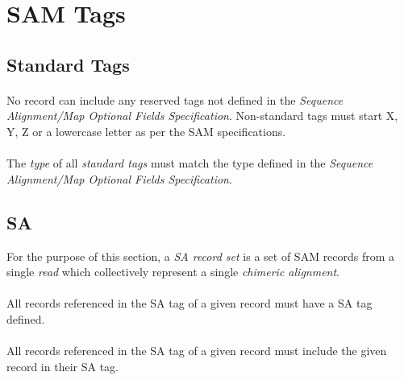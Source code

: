\documentclass[10pt]{article}
\begin{document}
\section{SAM Tags}

\subsection{Standard Tags}

\paragraph{}

No record can include any reserved tags not defined in the
{\sl Sequence Alignment/Map Optional Fields Specification}.
Non-standard tags must start X, Y, Z or a lowercase letter as per the SAM specifications.

\paragraph{}

The \textit{type} of all \textit{standard tags} must match the type
defined in the {\sl Sequence Alignment/Map Optional Fields Specification}.

\subsection{SA}

For the purpose of this section, a \textit{SA record set} is a set of SAM records
from a single \textit{read} which collectively represent a single \textit{chimeric alignment}.

\paragraph{}

All records referenced in the SA tag of a given record must have a SA tag defined.

\paragraph{}

All records referenced in the SA tag of a given record must include the given
record in their SA tag.

\paragraph{}
\end{document}
